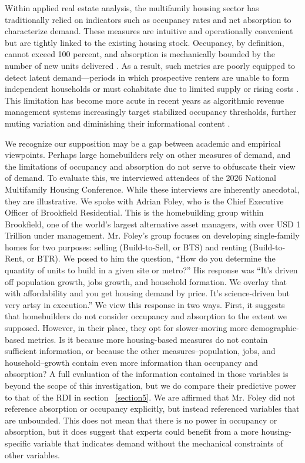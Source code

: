 \documentclass[pdflatex,sn-apa]{sn-jnl}%
\theoremstyle{thmstyleone}%
\theoremstyle{thmstyletwo}%
\theoremstyle{thmstylethree}%
\begin{document}
Within applied real estate analysis, the multifamily housing sector has traditionally
relied on indicators such as occupancy rates and net absorption to characterize demand.
These measures are intuitive and operationally convenient but are tightly linked to the
existing housing stock. Occupancy, by definition, cannot exceed 100 percent, and
absorption is mechanically bounded by the number of new units delivered
\cite{mueller1999real, gabriel2001rental}. As a result, such metrics are poorly equipped
to detect latent demand—periods in which prospective renters are unable to form
independent households or must cohabitate due to limited supply or rising costs
\cite{sirmans1991determinants, pyhrr1999real}. This limitation has become more acute in
recent years as algorithmic revenue management systems increasingly target stabilized
occupancy thresholds, further muting variation and diminishing their informational
content \cite{calder2024coordinated}.

We recognize our supposition may be a gap between academic and empirical viewpoints. Perhaps large homebuilders rely on other measures of demand, and the limitations of occupancy and absorption do not serve to obfuscate their view of demand. 
To evaluate this, we interviewed attendees of the 2026 National Multifamily Housing Conference. While these interviews are inherently anecdotal, they are illustrative. We spoke with Adrian Foley, who is the Chief Executive Officer of Brookfield Residential. This is the homebuilding group within Brookfield, one of the world's largest alternative asset managers, with over USD 1 Trillion under management. Mr. Foley's group focuses on developing single-family homes for two purposes: selling (Build-to-Sell, or BTS) and renting (Build-to-Rent, or BTR). We posed to him the question, ``How do you determine the quantity of units to build in a given site or metro?'' His response was
``It's driven off population growth, jobs growth, and household formation. We overlay that with affordability and you get housing demand by price.  It's science-driven but very artsy in execution.'' We view this response in two ways. First, it suggests that homebuilders do not consider occupancy and absorption to the extent we supposed. However, in their place, they opt for slower-moving more demographic-based metrics. Is it because more housing-based measures do not contain sufficient information, or because the other measures--population, jobs, and household--growth contain even more information than occupancy and absorption? A full evaluation of the information contained in those variables is beyond the scope of this investigation, but we do compare their predictive power to that of the RDI in section ~\ref{section5}. 
We are affirmed that Mr. Foley did not reference absorption or occupancy explicitly, but instead referenced variables that are unbounded. This does not mean that there is no power in occupancy or absorption, but it does suggest that experts could benefit from a more housing-specific variable that indicates demand without the mechanical constraints of other variables. 
\end{document}
